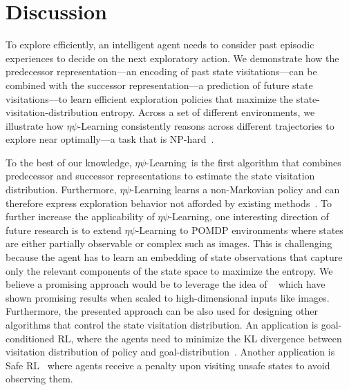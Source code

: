 \documentclass{article}
\theoremstyle{plain}
\theoremstyle{definition}
\theoremstyle{remark}
\newcommand{\alg}{$\eta$$\psi$-Learning}
\begin{document}
\section{Discussion}
To explore efficiently, an intelligent agent needs to consider past episodic experiences to decide on the next exploratory action.
We demonstrate how the predecessor representation---an encoding of past state visitations---can be combined with the successor representation---a prediction of future state visitations---to learn efficient exploration policies that maximize the state-visitation-distribution entropy.
Across a set of different environments, we illustrate how \alg{} consistently reasons across different trajectories to explore near optimally---a task that is NP-hard~\cite{mutti2022maximumentropyexploration}. 

To the best of our knowledge, \alg{}~is the first algorithm that combines predecessor and successor representations to estimate the state visitation distribution. 
Furthermore, \alg{} learns a non-Markovian policy and can therefore express exploration behavior not afforded by existing methods~\cite{pmlr-v97-hazan19a,lee2019efficient,mutti2021task,guo2021geometric}.
To further increase the applicability of \alg{}, one interesting direction of future research is to extend \alg{} to POMDP environments where states are either partially observable or complex such as images. This is challenging because the agent has to learn an embedding of state observations that capture only the relevant components of the state space to maximize the entropy. 
We believe a promising approach would be to leverage the idea of ~\cite{touati2021learning,touati2022does,farebrother2023proto} which have shown promising results when scaled to high-dimensional inputs like images. 
Furthermore, the presented approach can be also used for designing other algorithms that control the state visitation distribution. 
An application is goal-conditioned RL, where the agents need to minimize the KL divergence between visitation distribution of policy and goal-distribution~\cite {lee2019efficient,pong2019skew}. 
Another application is Safe RL~\citep{wagener2021safe} where agents receive a penalty upon visiting unsafe states to avoid observing them. 
\end{document}
